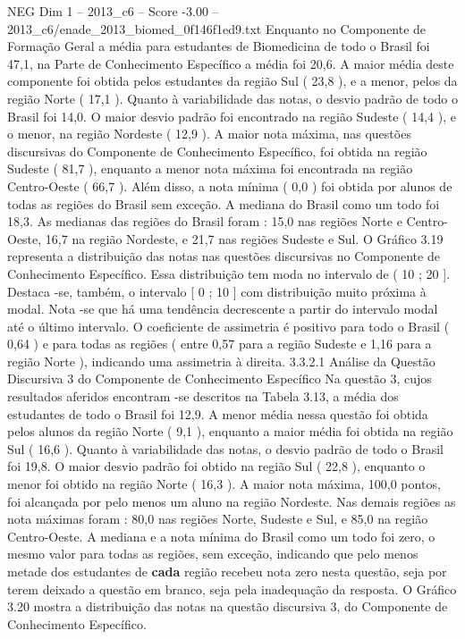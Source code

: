 \begin{textsample}{NEG Dim 1 – 2013\_c6 – Score -3.00 – 2013\_c6/enade\_2013\_biomed\_0f146f1ed9.txt}
Enquanto no Componente de Formação Geral a média para estudantes de Biomedicina de todo o Brasil foi 47,1, na Parte de Conhecimento Específico a média foi 20,6.
A maior média deste componente foi obtida pelos estudantes da região Sul ( 23,8 ), e a menor, pelos da região Norte ( 17,1 ).
Quanto à variabilidade das notas, o desvio padrão de todo o Brasil foi 14,0.
O maior desvio padrão foi encontrado na região Sudeste ( 14,4 ), e o menor, na região Nordeste ( 12,9 ).
A maior nota máxima, nas questões discursivas do Componente de Conhecimento Específico, foi obtida na região Sudeste ( 81,7 ), enquanto a menor nota máxima foi encontrada na região Centro-Oeste ( 66,7 ).
Além disso, a nota mínima ( 0,0 ) foi obtida por alunos de todas as regiões do Brasil sem exceção.
A mediana do Brasil como um todo foi 18,3.
As medianas das regiões do Brasil foram : 15,0 nas regiões Norte e Centro-Oeste, 16,7 na região Nordeste, e 21,7 nas regiões Sudeste e Sul.
O Gráfico 3.19 representa a distribuição das notas nas questões discursivas no Componente de Conhecimento Específico.
Essa distribuição tem moda no intervalo de ( 10 ; 20 ].
Destaca -se, também, o intervalo [ 0 ; 10 ] com distribuição muito próxima à modal.
Nota -se que há uma tendência decrescente a partir do intervalo modal até o último intervalo.
O coeficiente de assimetria é positivo para todo o Brasil ( 0,64 ) e para todas as regiões ( entre 0,57 para a região Sudeste e 1,16 para a região Norte ), indicando uma assimetria à direita. 3.3.2.1 Análise da Questão Discursiva 3 do Componente de Conhecimento Específico Na questão 3, cujos resultados aferidos encontram -se descritos na Tabela 3.13, a média dos estudantes de todo o Brasil foi 12,9.
A menor média nessa questão foi obtida pelos alunos da região Norte ( 9,1 ), enquanto a maior média foi obtida na região Sul ( 16,6 ).
Quanto à variabilidade das notas, o desvio padrão de todo o Brasil foi 19,8.
O maior desvio padrão foi obtido na região Sul ( 22,8 ), enquanto o menor foi obtido na região Norte ( 16,3 ).
A maior nota máxima, 100,0 pontos, foi alcançada por pelo menos um aluno na região Nordeste.
Nas demais regiões as nota máximas foram : 80,0 nas regiões Norte, Sudeste e Sul, e 85,0 na região Centro-Oeste.
A mediana e a nota mínima do Brasil como um todo foi zero, o mesmo valor para todas as regiões, sem exceção, indicando que pelo menos metade dos estudantes de \textbf{cada} região recebeu nota zero nesta questão, seja por terem deixado a questão em branco, seja pela inadequação da resposta.
O Gráfico 3.20 mostra a distribuição das notas na questão discursiva 3, do Componente de Conhecimento Específico.

\end{textsample}
